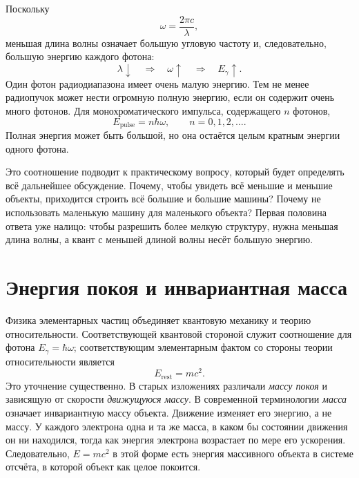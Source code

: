 Поскольку
\begin{equation}
\omega=\frac{2\pi c}{\lambda},
\end{equation}
меньшая длина волны означает большую угловую частоту и, следовательно, большую энергию каждого фотона:
\begin{equation}
\lambda\downarrow
\quad\Longrightarrow\quad
\omega\uparrow
\quad\Longrightarrow\quad
E_\gamma\uparrow.
\end{equation}
Один фотон радиодиапазона имеет очень малую энергию. Тем не менее радиопучок может нести огромную полную энергию, если он содержит очень много фотонов. Для монохроматического импульса, содержащего \(n\) фотонов,
\begin{equation}
E_{\text{pulse}}=n\hbar\omega,
\qquad
n=0,1,2,\ldots.
\end{equation}
Полная энергия может быть большой, но она остаётся целым кратным энергии одного фотона.

Это соотношение подводит к практическому вопросу, который будет определять всё дальнейшее обсуждение. Почему, чтобы увидеть всё меньшие и меньшие объекты, приходится строить всё большие и большие машины? Почему не использовать маленькую машину для маленького объекта? Первая половина ответа уже налицо: чтобы разрешить более мелкую структуру, нужна меньшая длина волны, а квант с меньшей длиной волны несёт большую энергию.

\section{Энергия покоя и инвариантная масса}

Физика элементарных частиц объединяет квантовую механику и теорию относительности. Соответствующей квантовой стороной служит соотношение для фотона \(E_\gamma=\hbar\omega\); соответствующим элементарным фактом со стороны теории относительности является
\begin{equation}
E_{\mathrm{rest}}=mc^2.
\end{equation}
Это уточнение существенно. В старых изложениях различали \emph{массу покоя} и зависящую от скорости \emph{движущуюся массу}. В современной терминологии \emph{масса} означает инвариантную массу объекта. Движение изменяет его энергию, а не массу. У каждого электрона одна и та же масса, в каком бы состоянии движения он ни находился, тогда как энергия электрона возрастает по мере его ускорения. Следовательно, \(E=mc^2\) в этой форме есть энергия массивного объекта в системе отсчёта, в которой объект как целое покоится.

